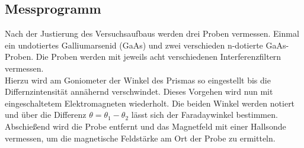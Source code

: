 \subsection{Messprogramm}
Nach der Justierung des Versuchsaufbaus werden drei Proben vermessen. Einmal ein undotiertes
Galliumarsenid (GaAs) und zwei verschieden n-dotierte GaAs-Proben. Die Proben werden mit jeweils
acht verschiedenen Interferenzfiltern vermessen.\\
Hierzu wird am Goniometer der Winkel des Prismas so eingestellt bis die Differnzintensität annähernd
verschwindet. Dieses Vorgehen wird nun mit eingeschaltetem Elektromagneten wiederholt.
Die beiden Winkel werden notiert und über die Differenz $\theta=\theta_1-\theta_2$ lässt sich der Faradaywinkel bestimmen.\\
Abschießend wird die Probe entfernt und das Magnetfeld mit einer Hallsonde vermessen, um  
die magnetische Feldstärke am Ort der Probe zu ermitteln.
